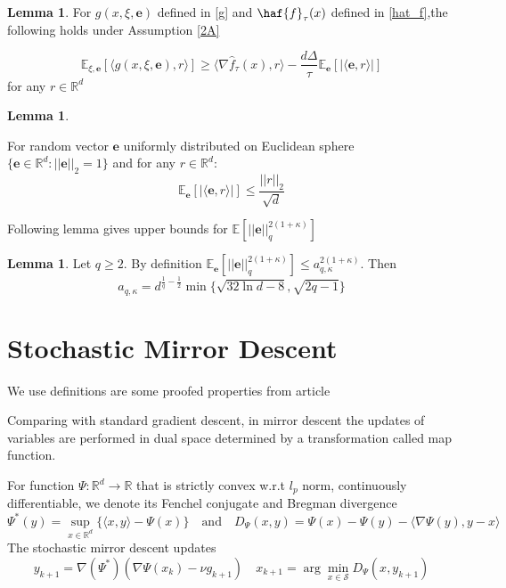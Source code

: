 \documentclass{article}
\newcommand{\RR}{\mathcal{R}}
\theoremstyle{definition}
\newtheorem{lemma}[theorem]{Lemma}
\theoremstyle{remark}
\def\RR{\mathbb{R}}
\def\EE{\mathbb{E}}
\begin{document}
\begin{lemma}\label{inner product grad r}
For $g(x, \xi, \mathbf{e})$ defined in \ref{g} and $\haf{f}_\tau(x)$ defined in \ref{hat_f},the following holds under Assumption \ref{2A}

$$\EE_{\xi, \mathbf{e}} [\langle g(x,\xi, \mathbf{e}), r \rangle] \geq \langle \nabla \hat{f}_\tau(x) , r \rangle - \frac{d \Delta}{\tau}\EE_\mathbf{e} [|\langle \mathbf{e}, r \rangle|] $$
for any $r \in \RR^d$
\end{lemma}

\begin{lemma}\label{inner product estimate}

For random  vector $\mathbf{e}$ uniformly distributed on Euclidean sphere $\{\mathbf{e} \in \RR^d: ||\mathbf{e}||_2 = 1\}$ and for any $r \in \RR^d$:
$$\EE_\mathbf{e}[|\langle \mathbf{e}, r \rangle|] \leq \frac{||r||_2}{\sqrt{d}}$$
\end{lemma}
Following lemma gives upper bounds for $\EE\left[||\mathbf{e}||_q^{2(1+\kappa)}\right]$
\begin{lemma}\label{upper bounds}
Let $q \geq 2$. By definition $\EE_\mathbf{e} \left[||\mathbf{e}||_q^{2(1+\kappa)}\right]  \leq a_{q, \kappa}^{2(1+\kappa)}$. Then
$$a_{q, \kappa} = d^{\frac1q - \frac12}  \min \{ \sqrt{32\ln d - 8} , \sqrt{2q - 1}\} $$
\end{lemma}

\section{Stochastic Mirror Descent}
We use definitions are some proofed properties from article \cite{vural2022mirror}

Comparing with standard gradient descent, in mirror descent the updates of variables  are performed in dual space determined by a transformation called map function.  

For function $\Psi: \RR^d \rightarrow \RR$ that is strictly convex w.r.t $l_p$ norm, continuously differentiable, we denote its Fenchel conjugate and Bregman divergence 
$$\Psi^*(y)= \sup\limits_{x \in \RR^d} \{\langle x,y \rangle - \Psi(x) \} \quad \text{and} \quad  D_{\Psi}(x,y) = \Psi(x) - \Psi(y) - \langle \nabla \Psi(y), y -x \rangle$$
The stochastic mirror descent updates
\begin{equation}\label{MD}
y_{k+1} = \nabla(\Psi^*) (\nabla \Psi(x_k) - \nu g_{k+1}) \quad x_{k+1} = \arg \min\limits_{x \in \mathcal{S}} D_{\Psi}(x, y_{k+1})
\end{equation}
\end{document}

